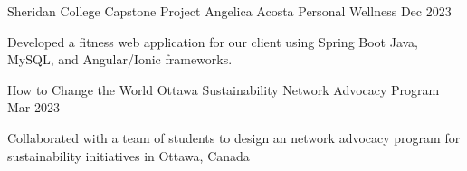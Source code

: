 \begin{cventries}
  \cventry
    {Sheridan College Capstone Project}
    {Angelica Acosta Personal Wellness}
    {}
    {Dec 2023}
    {
      \begin{cvitems}
        \item {Developed a fitness web application for our client using Spring Boot Java, MySQL, and Angular/Ionic frameworks.}
        \end{cvitems}
    }
  \cventry
    {How to Change the World}
    {Ottawa Sustainability Network Advocacy Program}
    {}
    {Mar 2023}
    {
      \begin{cvitems}
        \item {Collaborated with a team of students to design an network advocacy program for sustainability initiatives in Ottawa, Canada}      
        \end{cvitems}
    }
\end{cventries}